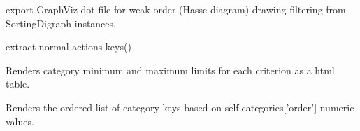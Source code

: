 \documentclass[letterpaper,10pt,english]{sphinxmanual}
\begin{document}
\begin{fulllineitems}
\begin{fulllineitems}
\end{fulllineitems}


\begin{fulllineitems}
\label{techDoc:sortingDigraphs.SortingDigraph.exportGraphViz}
export GraphViz dot file for weak order (Hasse diagram) drawing
filtering from SortingDigraph instances.

\end{fulllineitems}


\begin{fulllineitems}
\label{techDoc:sortingDigraphs.SortingDigraph.getActionsKeys}
extract normal actions keys()

\end{fulllineitems}


\begin{fulllineitems}
\label{techDoc:sortingDigraphs.SortingDigraph.htmlCriteriaCategoryLimits}
Renders category minimum and maximum limits for each criterion
as a html table.

\end{fulllineitems}


\begin{fulllineitems}
\label{techDoc:sortingDigraphs.SortingDigraph.orderedCategoryKeys}
Renders the ordered list of category keys
based on self.categories{[}'order'{]} numeric values.

\end{fulllineitems}



\end{fulllineitems}
\end{document}
